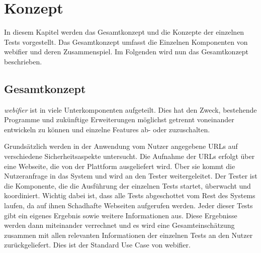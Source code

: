 \chapter{Konzept}

In diesem Kapitel werden das Gesamtkonzept und die Konzepte der einzelnen Tests vorgestellt. Das Gesamtkonzept umfasst die Einzelnen Komponenten von webifier und deren Zusammenspiel. Im Folgenden wird nun das Gesamtkonzept beschrieben.

\section{Gesamtkonzept}

\textit{webifier} ist in viele Unterkomponenten aufgeteilt.
Dies hat den Zweck, bestehende Programme und zukünftige Erweiterungen möglichst getrennt voneinander entwickeln zu können und einzelne Features ab- oder zuzuschalten.

Grundsätzlich werden in der Anwendung vom Nutzer angegebene URLs auf verschiedene Sicherheitsaspekte untersucht.
Die Aufnahme der URLs erfolgt über eine Webseite, die von der Plattform ausgeliefert wird.
Über sie kommt die Nutzeranfrage in das System und wird an den Tester weitergeleitet.
Der Tester ist die Komponente, die die Ausführung der einzelnen Tests startet, überwacht und koordiniert.
Wichtig dabei ist, dass alle Tests abgeschottet vom Rest des Systems laufen, da auf ihnen Schadhafte Webseiten aufgerufen werden.
Jeder dieser Tests gibt ein eigenes Ergebnis sowie weitere Informationen aus.
Diese Ergebnisse werden dann miteinander verrechnet und es wird eine Gesamteinschätzung zusammen mit allen relevanten Informationen der einzelnen Tests an den Nutzer zurückgeliefert.
Dies ist der Standard Use Case von webifier.

